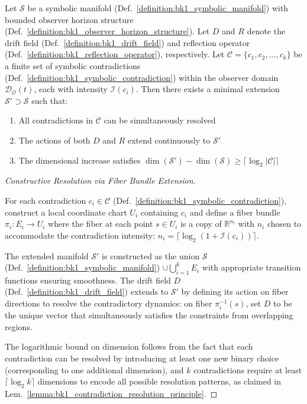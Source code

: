 \begin{lemma}
\label{lemma:bk1_contradiction_resolution_principle}
Let $\mathcal{S}$ be a symbolic manifold (Def.~\ref{definition:bk1_symbolic_manifold}) with bounded observer horizon structure (Def.~\ref{definition:bk1_observer_horizon_structure}). Let $D$ and $R$ denote the drift field (Def.~\ref{definition:bk1_drift_field}) and reflection operator (Def.~\ref{definition:bk1_reflection_operator}), respectively. Let $\mathcal{C} = \{c_1, c_2, \ldots, c_k\}$ be a finite set of symbolic contradictions (Def.~\ref{definition:bk1_symbolic_contradiction}) within the observer domain $\mathcal{D}_\mathcal{O}(t)$, each with intensity $\mathcal{I}(c_i)$. Then there exists a minimal extension $\mathcal{S}' \supset \mathcal{S}$ such that:
\begin{enumerate}
    \item All contradictions in $\mathcal{C}$ can be simultaneously resolved
    \item The actions of both $D$ and $R$ extend continuously to $\mathcal{S}'$
    \item The dimensional increase satisfies $\dim(\mathcal{S}') - \dim(\mathcal{S}) \geq \lceil \log_2 |\mathcal{C}| \rceil$
\end{enumerate}
\end{lemma}

\begin{proof}[Constructive Resolution via Fiber Bundle Extension]
\label{proof:bk1_constructive_resolution}
\leavevmode

For each contradiction $c_i \in \mathcal{C}$ (Def.~\ref{definition:bk1_symbolic_contradiction}), construct a local coordinate chart $U_i$ containing $c_i$ and define a fiber bundle $\pi_i: E_i \to U_i$ where the fiber at each point $s \in U_i$ is a copy of $\mathbb{R}^{n_i}$ with $n_i$ chosen to accommodate the contradiction intensity: $n_i = \lceil \log_2(1 + \mathcal{I}(c_i)) \rceil$.

The extended manifold $\mathcal{S}'$ is constructed as the union $\mathcal{S}$ (Def.~\ref{definition:bk1_symbolic_manifold}) $\cup \bigcup_{i=1}^k E_i$ with appropriate transition functions ensuring smoothness. The drift field $D$ (Def.~\ref{definition:bk1_drift_field}) extends to $\mathcal{S}'$ by defining its action on fiber directions to resolve the contradictory dynamics: on fiber $\pi_i^{-1}(s)$, set $D$ to be the unique vector that simultaneously satisfies the constraints from overlapping regions.

The logarithmic bound on dimension follows from the fact that each contradiction can be resolved by introducing at least one new binary choice (corresponding to one additional dimension), and $k$ contradictions require at least $\lceil \log_2 k \rceil$ dimensions to encode all possible resolution patterns, as claimed in Lem.~\ref{lemma:bk1_contradiction_resolution_principle}.
\end{proof}

